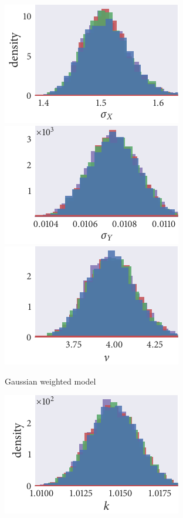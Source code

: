 \begin{figure}[p]
\begin{subfigure}[b]{\textwidth}
  \end{subfigure}
  \begin{subfigure}[b]{\textwidth}
    \includegraphics{seq1/gauss_hist_sigma_X.pdf}%
    \includegraphics{seq1/gauss_hist_sigma_Y.pdf}%
    \includegraphics{seq1/gauss_hist_nu.pdf}
    \caption{Gaussian weighted model}
    \label{subfig:posterior_seq1_gauss}
  \end{subfigure}
  \begin{subfigure}[b]{\textwidth}
    \includegraphics{seq1/top_hist_k.pdf}%

\end{subfigure}
\end{figure}

